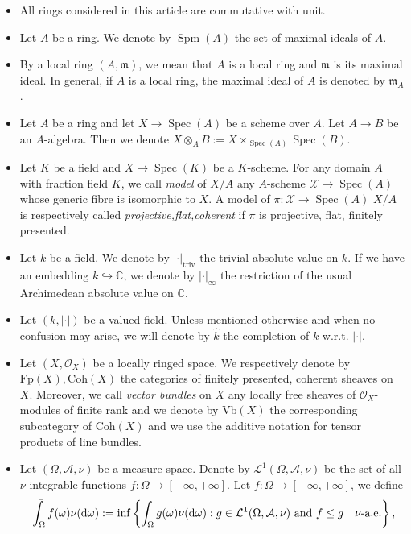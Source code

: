 \documentclass [11pt,reqno]{amsart}
\def\bC{{\mathbb{C}}}
\newcommand{\1}{\mathmybb{1}}
\def\cA{{\mathcal{A}}}
\def\cL{{\mathcal{L}}}
\def\cO{{\mathcal{O}}}
\def\cX{{\mathcal{X}}}
\def\m{\mathfrak m}
\def\diff{\mathrm{d}}
\def\Spec{\operatorname{Spec}}
\def\Spm{\operatorname{Spm}}
\def\triv{\operatorname{triv}}
\def\upint{\mathchoice%
    {\mkern13mu\overline{\vphantom{\intop}\mkern7mu}\mkern-20mu}%
    {\mkern7mu\overline{\vphantom{\intop}\mkern7mu}\mkern-14mu}%
    {\mkern7mu\overline{\vphantom{\intop}\mkern7mu}\mkern-14mu}%
    {\mkern7mu\overline{\vphantom{\intop}\mkern7mu}\mkern-14mu}%
  \int}
\begin{document}
\begin{itemize}
	\item All rings considered in this article are commutative with unit.
	\item Let $A$ be a ring. We denote by $\Spm(A)$ the set of maximal ideals of $A$.
	\item By a local ring $(A,\m)$, we mean that $A$ is a local ring and $\m$ is its maximal ideal. In general, if $A$ is a local ring, the maximal ideal of $A$ is denoted by $\m_A$.  
	\item Let $A$ be a ring and let $X \to \Spec(A)$ be a scheme over $A$. Let $A\to B$ be an $A$-algebra. Then we denote $X \otimes_{A} B := X \times_{\Spec(A)} \Spec(B)$.
	\item Let $K$ be a field and $X\to \Spec(K)$ be a $K$-scheme. For any domain $A$ with fraction field $K$, we call \emph{model} of $X/A$ any $A$-scheme $\cX \to \Spec(A)$ whose generic fibre is isomorphic to $X$. A model of $\pi : \cX\to \Spec(A)$ $X/A$ is respectively called \emph{projective,flat,coherent} if $\pi$ is projective, flat, finitely presented.
	\item Let $k$ be a field. We denote by $|\cdot|_{\triv}$ the trivial absolute value on $k$. If we have an embedding $k \hookrightarrow \bC$, we denote by $|\cdot|_{\infty}$ the restriction of the usual Archimedean absolute value on $\bC$.
	\item Let $(k,|\cdot|)$ be a valued field. Unless mentioned otherwise and when no confusion may arise, we will denote by $\widehat{k}$ the completion of $k$ w.r.t. $|\cdot|$.
	\item Let $(X,\cO_X)$ be a locally ringed space. We respectively denote by $\mathrm{Fp}(X),\mathrm{Coh}(X)$ the categories of finitely presented, coherent sheaves on $X$. Moreover, we call \emph{vector bundles} on $X$ any locally free sheaves of $\cO_{X}$-modules of finite rank and we denote by $\mathrm{Vb}(X)$ the corresponding subcategory of $\mathrm{Coh}(X)$ and we use the additive notation for tensor products of line bundles. 
	\item Let $(\Omega,\cA,\nu)$ be a measure space. Denote by $\cL^{1}(\Omega,\cA,\nu)$ be the set of all $\nu$-integrable functions $f:\Omega \to [-\infty,+\infty]$. Let $f : \Omega \to [-\infty,+\infty]$, we define
\begin{align*}
\upint_{\Omega} f(\omega)\nu(\diff\omega) := \inf\left\{\int_{\Omega}g(\omega)\nu(\diff\omega) : g\in \cL^{1}(\Omega,\cA,\nu) \text{ and } f \leq g \quad\nu\text{-a.e.}\right\},

\end{align*}
\end{itemize}
\end{document}
